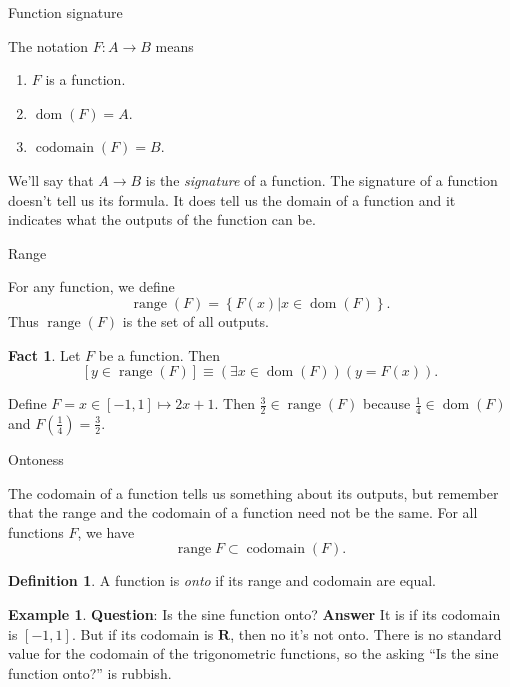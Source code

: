 \documentclass[fleqn]{beamer}
\newcommand{\reals}{\mathbf{R}}
\DeclareMathOperator{\range}{range}
\DeclareMathOperator{\domain}{dom}
\DeclareMathOperator{\dom}{dom}
\DeclareMathOperator{\codomain}{codomain}
\theoremstyle{definition}
\newtheorem{mydef}{Definition}
\newtheorem{myex}{Example}
\newtheorem{myfact}{Fact}
\begin{document}
\begin{frame}{Function signature}

The notation \(F : A \to B\) means

\begin{enumerate}

\item \(F\) is a function.
\item \(\dom(F) = A \).
\item  \(\codomain(F) = B\).
\end{enumerate}

\vspace{0.1in}


We'll say that  \(A \to B\) is the \emph{signature} of a function.  The signature of a function doesn't tell us its formula. It does tell us the domain of a function and it indicates what the outputs of the function can be.


\end{frame}
\begin{frame}{Range}
\begin{definition} For any function, we define
\[
   \range(F) = \left \{F(x) | x \in \domain(F)  \right \}.
\]
Thus \(\range(F)\) is the set of all outputs.
\end{definition}

\begin{myfact} Let \(F\) be a function. Then
\[
     \left[ y \in \range(F)  \right] \equiv  \left(\exists x \in \domain(F) \right)(y = F(x)).
 \]
\end{myfact}

\begin{example} Define \(F = x \in [-1,1] \mapsto 2 x + 1\). Then \(\frac{3}{2} \in \range(F)\) because \(\frac{1}{4} \in \domain(F)\) and \(F(\frac{1}{4}) = \frac{3}{2}\).

\end{example}
\end{frame}
\begin{frame}{Ontoness}

The codomain of a function tells us something about its outputs, but remember that the range and the codomain of a function need not be the same. For all functions \(F\), we have
\[
   \range{F} \subset \codomain(F).
\]

\begin{mydef} A function is \emph{onto} if its range and codomain are equal. \end{mydef}

\begin{myex} \textbf{Question}: Is the sine function onto?  \textbf{Answer} It is if its codomain is \([-1,1]\).  But if its codomain is \(\reals\), then no it's not onto. There is no standard value for the codomain of the trigonometric functions, so the asking ``Is the sine function onto?'' is  rubbish.\end{myex}
\end{frame}
\end{document}
